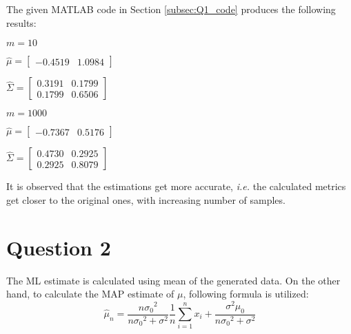 \documentclass[11pt]{extarticle}
\begin{document}
The given MATLAB code in Section \ref{subsec:Q1_code} produces the following results:\\
\begin{minipage}{0.2\textwidth}
    $m = 10$
\end{minipage}
\begin{minipage}{0.35\textwidth}
    $\hat{\mu} = \begin{bmatrix} -0.4519 & 1.0984 \end{bmatrix}$
\end{minipage}
\begin{minipage}{0.66\textwidth}
    $\hat{\Sigma} = \begin{bmatrix} 0.3191 & 0.1799 \\ 0.1799 & 0.6506 \end{bmatrix}$
\end{minipage}
\begin{minipage}{0.2\textwidth}
    $m = 1000$
\end{minipage}
\begin{minipage}{0.35\textwidth}
    $\hat{\mu} = \begin{bmatrix} -0.7367 & 0.5176 \end{bmatrix}$
\end{minipage}
\begin{minipage}{0.66\textwidth}
    $\hat{\Sigma} = \begin{bmatrix} 0.4730 & 0.2925 \\ 0.2925 & 0.8079 \end{bmatrix}$
\end{minipage}
It is observed that the estimations get more accurate, \textit{i.e.} the calculated metrics get closer to the original ones,  with increasing number of samples.

\section{Question 2}

The ML estimate is calculated using mean of the generated data. On the other hand, to calculate the MAP estimate of $\mu$, following formula is utilized:\\

\begin{equation}
    \label{eq:mu_map}
    {\hat{\mu}}_{n} = \frac{n{\sigma_0}^2}{n{\sigma_0}^2+\sigma^2} \frac{1}{n}\sum_{i=1}^n x_i + \frac{{\sigma}^2\mu_0}{n{\sigma_0}^2+\sigma^2}
\end{equation}
\end{document}
